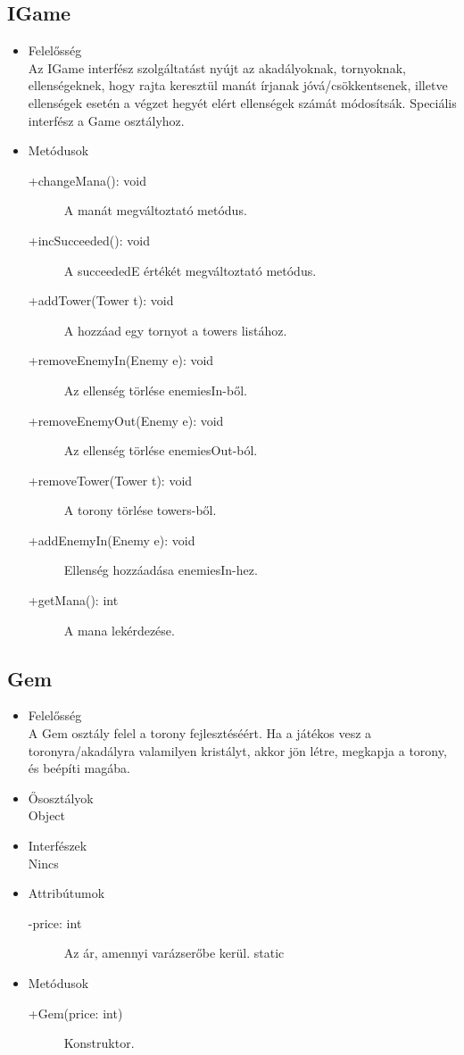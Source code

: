 \subsection{IGame}
\begin{itemize}
\item Felelősség\\
Az IGame interfész szolgáltatást nyújt az akadályoknak, tornyoknak, ellenségeknek, hogy rajta keresztül manát írjanak jóvá/csökkentsenek, illetve ellenségek esetén a végzet hegyét elért ellenségek számát módosítsák. Speciális interfész a Game osztályhoz. 

\item Metódusok\\
	\begin{description}
		\item[+changeMana(): void] A manát megváltoztató metódus. 
\item[+incSucceeded(): void] A succeededE értékét megváltoztató metódus.
\item[+addTower(Tower t): void] A hozzáad egy tornyot a towers listához.
\item[+removeEnemyIn(Enemy e): void] Az ellenség törlése enemiesIn-ből. 
\item[+removeEnemyOut(Enemy e): void] Az ellenség törlése enemiesOut-ból. 
\item[+removeTower(Tower t): void] A torony törlése towers-ből. 
\item[+addEnemyIn(Enemy e): void] Ellenség hozzáadása enemiesIn-hez. 
\item[+getMana(): int] A mana lekérdezése. 


		
	\end{description}
\end{itemize}

\subsection{Gem}
\begin{itemize}
\item Felelősség\\
A Gem osztály felel a torony fejlesztéséért. Ha a játékos vesz a toronyra/akadályra valamilyen kristályt, akkor jön létre, megkapja a torony, és beépíti magába. 
\item Ősosztályok\\
Object
\item Interfészek\\
Nincs
\item Attribútumok\\
	\begin{description}
		\item[-price: int] Az ár, amennyi varázserőbe kerül. static
	\end{description}
\item Metódusok\\
	\begin{description}
		
		\item[+Gem(price: int)] Konstruktor. 
		
		
	\end{description}
\end{itemize}

